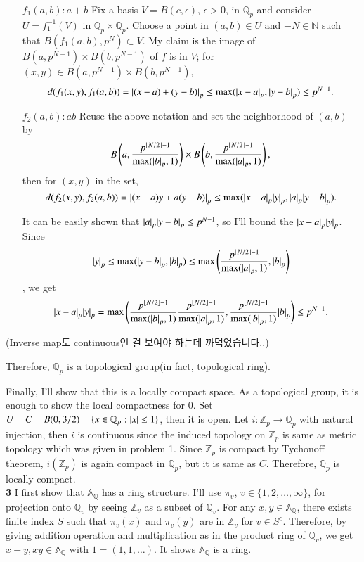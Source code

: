 \documentclass[a4paper, 12pt]{article}
\theoremstyle{Mydefinition}
\theoremstyle{Mytheorem}
\DeclarePairedDelimiter\floor{\lfloor}{\rfloor}
\begin{document}
\begin{enumerate}
    \item[$f_1(a,b): a+b$] Fix a basis $V = B(c, \epsilon)$, $\epsilon>0$, in $\mathbb{Q}_p$ and consider $U=f_1^{-1}(V)$ in $\mathbb{Q}_p\times \mathbb{Q}_p$. Choose a point in $(a,b)\in U$ and $-N\in \mathbb{N}$ such that $B(f_1(a,b), p^{N})\subset V$. My claim is the image of $B(a, p^{N-1})\times B(b, p^{N-1})$ of $f$ is in $V$; for $(x,y)\in B(a, p^{N-1})\times B(b, p^{N-1})$, $$d(f_1(x,y), f_1(a,b)) = \abs{(x-a)+(y-b)}_p\leq \max(\abs{x-a}_p, \abs{y-b}_p)\leq p^{N-1}.$$

    \item[$f_2(a,b):ab$] Reuse the above notation and set the neighborhood of $(a,b)$ by $$B\left(a, \frac{p^{\floor{N/2}-1}}{\max(\abs{b}_p, 1)}\right)\times B\left(b, \frac{p^{\floor{N/2}-1}}{\max(\abs{a}_p, 1)}\right),$$ then for $(x,y)$ in the set, $$d(f_2(x,y), f_2(a,b)) = \abs{(x-a)y+a(y-b)}_p\leq \max(\abs{x-a}_p\abs{y}_p, \abs{a}_p\abs{y-b}_p).$$
    
    It can be easily shown that $\abs{a}_p\abs{y-b}_p\leq p^{N-1}$, so I'll bound the $\abs{x-a}_p\abs{y}_p$. Since $$\abs{y}_p\leq \max(\abs{y-b}_p, \abs{b}_p)\leq \max\left(\frac{p^{\floor{N/2}-1}}{\max(\abs{a}_p, 1)}, \abs{b}_p\right)$$, we get $$\abs{x-a}_p\abs{y}_p = \max\left(\frac{p^{\floor{N/2}-1}}{\max(\abs{b}_p, 1)} \frac{p^{\floor{N/2}-1}}{\max(\abs{a}_p, 1)}, \frac{p^{\floor{N/2}-1}}{\max(\abs{b}_p, 1)}\abs{b}_p\right)\leq p^{N-1}.$$
    
\end{enumerate}
(Inverse map도 continuous인 걸 보여야 하는데 까먹었습니다..)

Therefore, $\mathbb{Q}_p$ is a topological group(in fact, topological ring).

Finally, I'll show that this is a locally compact space. As a topological group, it is enough to show the local compactness for $0$. Set $U = C = B(0,3/2) = \{x\in \mathbb{Q}_p:\abs{x}\leq 1\}$, then it is open. Let $i:\mathbb{Z}_p\rightarrow \mathbb{Q}_p$ with natural injection, then $i$ is continuous since the induced topology on $\mathbb{Z}_p$ is same as metric topology which was given in problem 1. Since $\mathbb{Z}_p$ is compact by Tychonoff theorem, $i(\mathbb{Z}_p)$ is again compact in $\mathbb{Q}_p$, but it is same as $C$. Therefore, $\mathbb{Q}_p$ is locally compact.
\\



\noindent \textbf{3} I first show that $\mathbb{A}_\mathbb{Q}$ has a ring structure. I'll use $\pi_v$, $v\in\{1,2,\ldots, \infty\}$, for projection onto $\mathbb{Q}_v$ by seeing $\mathbb{Z}_v$ as a subset of $\mathbb{Q}_v$. For any $x,y\in \mathbb{A}_\mathbb{Q}$, there exists finite index $S$ such that $\pi_v(x)$ and $\pi_v(y)$ are in $\mathbb{Z}_v$ for $v\in S^c$. Therefore, by giving addition operation and multiplication as in the product ring of $\mathbb{Q}_v$, we get $x-y,xy\in \mathbb{A}_\mathbb{Q}$ with $1 = (1,1,\ldots)$. It shows $\mathbb{A}_\mathbb{Q}$ is a ring.
\end{document}
